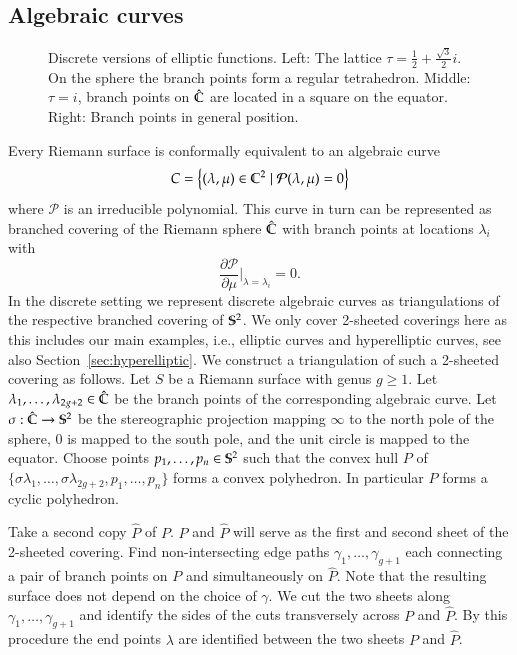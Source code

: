 \documentclass[Thesis]{subfiles}
\begin{document}
\subsection{Algebraic curves}
\label{sec:discrete_algebraic_curves}

\begin{figure}
\centering
{}
\caption{Discrete versions of elliptic functions. Left: The lattice $\tau=\frac{1}{2}+\frac{\sqrt 3}{2}i$. On the sphere the branch points form a regular tetrahedron. Middle: $\tau=i$, branch points on $\hat \C$ are located in a square on the equator. Right: Branch points in general position.}
\label{fig:p_functions}
\end{figure}

Every Riemann surface is conformally equivalent to an algebraic curve
\[C=\left\{(\lambda,\mu)\in \C^2 \mid \mathcal P(\lambda,\mu)=0\right\}\]
where $\mathcal P$ is an irreducible polynomial.
This curve in turn can be represented as branched covering of the Riemann sphere $\hat{\C}$ with branch points at locations $\lambda_i$ with \[\frac{\partial\mathcal P}{\partial \mu}\Bigr|_{\lambda=\lambda_i} = 0.\]
In the discrete setting we represent discrete algebraic curves as triangulations of the respective branched covering of $\S^2$.
We only cover 2-sheeted coverings here as this includes our main examples, i.e., elliptic curves and hyperelliptic curves, see also Section~\ref{sec:hyperelliptic}.
We construct a triangulation of such a 2-sheeted covering as follows.
Let $S$ be a Riemann surface with genus $g\geq 1$.
Let $\lambda_1,\ldots,\lambda_{2g+2}\in \hat\C$ be the branch points of the corresponding algebraic curve.
Let $\sigma :\hat\C\to\S^2$ be the stereographic projection mapping $\infty$ to the north pole of the sphere, $0$ is mapped to the south pole, and the unit circle is mapped to the equator.
Choose points $p_1,\ldots,p_n\in\S^2$ such that the convex hull $P$ of $\{\sigma\lambda_1,\ldots,\sigma\lambda_{2g+2},p_1,\ldots,p_n\}$ forms a convex polyhedron.
In particular $P$ forms a cyclic polyhedron.

Take a second copy $\hat P$ of $P$. $P$ and $\hat P$ will serve as the first and second sheet of the 2-sheeted covering.
Find non-intersecting edge paths $\gamma_1,\ldots,\gamma_{g+1}$ each connecting a pair of branch points on $P$ and simultaneously on $\hat P$.
Note that the resulting surface does not depend on the choice of $\gamma$.
We cut the two sheets along $\gamma_1,\ldots,\gamma_{g+1}$ and identify the sides of the cuts transversely across $P$ and $\hat P$.
By this procedure the end points $\lambda$ are identified between the two sheets $P$ and $\hat P$.
\end{document}
